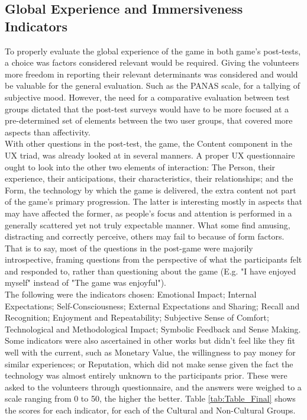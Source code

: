 \subsection{Global Experience and Immersiveness Indicators} \label{sec:results_surveys_immersiveness}
    To properly evaluate the global experience of the game in both game’s post-tests, a choice was factors considered relevant would be required. Giving the volunteers more freedom in reporting their relevant determinants was considered and would be valuable for the general evaluation. Such as the PANAS scale, for a tallying of subjective mood. However, the need for a comparative evaluation between test groups dictated that the post-test surveys would have to be more focused at a pre-determined set of elements between the two user groups, that covered more aspects than affectivity.\\
    With other questions in the post-test, the game, the Content component in the UX triad, was already looked at in several manners. A proper UX questionnaire ought to look into the other two elements of interaction: The Person, their experience, their anticipations, their characteristics, their relationships; and the Form, the technology by which the game is delivered, the extra content not part of the game’s primary progression. The latter is interesting mostly in aspects that may have affected the former, as people’s focus and attention is performed in a generally scattered yet not truly expectable manner. What some find amusing, distracting and correctly perceive, others may fail to because of form factors. That is to say, most of the questions in the post-game were majorily introspective, framing questions from the perspective of what the participants felt and responded to, rather than questioning about the game (E.g. "I have enjoyed myself" instead of "The game was enjoyful").\\
    The following were the indicators chosen: Emotional Impact; Internal Expectations; Self-Consciousness; External Expectations and Sharing; Recall and Recognition; Enjoyment and Repeatability; Subjective Sense of Comfort; Technological and Methodological Impact; Symbolic Feedback and Sense Making. Some indicators were also ascertained in other works but didn’t feel like they fit well with the current, such as Monetary Value, the willingness to pay money for similar experiences; or Reputation, which did not make sense given the fact the technology was almost entirely unknown to the participants prior. These were asked to the volunteers through questionnaire, and the answers were weighed to a scale ranging from 0 to 50, the higher the better. Table \ref{tab:Table_Final} shows the scores for each indicator, for each of the Cultural and Non-Cultural Groups.\\
    
